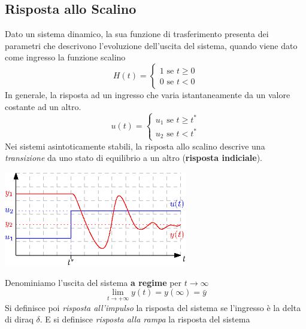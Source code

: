 \documentclass[10pt, letterpaper]{report}
\begin{document}
\subsection{Risposta allo Scalino}
Dato un sistema dinamico, la sua funzione di trasferimento presenta dei parametri che descrivono 
l'evoluzione dell'uscita del sistema, quando viene dato come ingresso la funzione scalino 
$$ H(t)=\begin{cases}
    1 \text{ se } t\ge 0 \\
    0 \text{ se } t<0
\end{cases}$$ 
In generale, la risposta ad un ingresso che varia istantaneamente da un valore costante ad un altro.
$$ u(t)=\begin{cases}
    u_1 \text{ se } t\ge t^* \\
    u_2 \text{ se } t<t^*
\end{cases}$$ 
Nei sistemi asintoticamente stabili, la risposta allo scalino descrive una \textit{transizione} da 
uno stato di equilibrio a un altro (\textbf{risposta indiciale}).\begin{center}
    \includegraphics[width=0.6\textwidth ]{images/scalino.eps}
\end{center}
Denominiamo l'uscita del sistema \textbf{a regime} per $t\rightarrow\infty$ 
$$ \lim_{t\rightarrow+\infty}y(t)=y(\infty)=\bar y$$
Si definisce poi \textit{risposta all'impulso} la risposta del sistema se l'ingresso è la 
delta di diraq $\delta$. E si definisce \textit{risposta alla rampa} la risposta del sistema 
\end{document}
